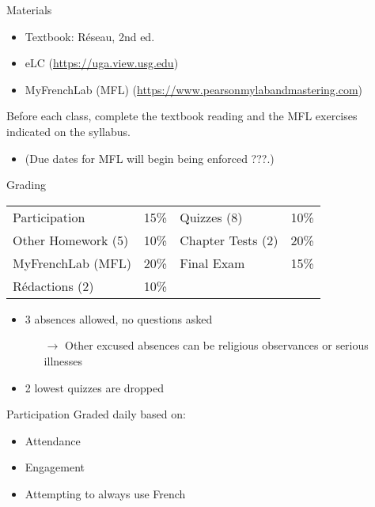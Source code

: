 \documentclass{beamer}
\begin{document}
  \begin{frame}{Materials}
    \begin{itemize}
      \item Textbook: Réseau, 2nd ed.
      \item eLC (\url{https://uga.view.usg.edu})
      \item MyFrenchLab (MFL) (\url{https://www.pearsonmylabandmastering.com})
    \end{itemize}
    \alert{Before each class}, complete the textbook reading and the MFL exercises indicated on the syllabus.
    \begin{itemize}
      \item (Due dates for MFL will begin being enforced ???.)
    \end{itemize}
  \end{frame}

  \begin{frame}{Grading}
    \begin{center}
      \begin{tabular}{l l | l l}
        Participation      & 15\% & Quizzes (8)       & 10\% \\
        Other Homework (5) & 10\% & Chapter Tests (2) & 20\% \\
        MyFrenchLab (MFL)  & 20\% & Final Exam        & 15\% \\
        Rédactions (2)     & 10\% &                   &
      \end{tabular}
    \end{center}
    \begin{itemize}
      \item 3 absences allowed, no questions asked
      \begin{itemize}
        \item[$\to$] Other excused absences can be religious observances or serious illnesses
      \end{itemize}
      \item 2 lowest quizzes are dropped
    \end{itemize}
  \end{frame}

  \begin{frame}{Participation}
    Graded daily based on:
    \begin{itemize}
      \item Attendance
      \item Engagement
      \item Attempting to always use French
    \end{itemize}
  \end{frame}
\end{document}
